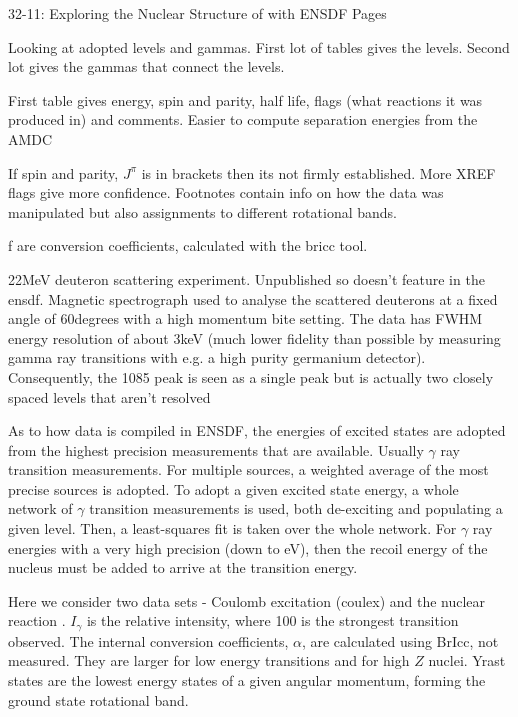 \begin{example}{3}{2-11: Exploring the Nuclear Structure of  with ENSDF Pages}

Looking at adopted levels and gammas. First lot of tables gives the levels. Second lot gives the gammas that connect the levels.

First table gives energy, spin and parity, half life, flags (what reactions it was produced in) and comments. 
Easier to compute separation energies from the AMDC

If spin and parity, \(J^\pi\) is in brackets then its not firmly established. More XREF flags give more confidence. Footnotes contain info on how the data was manipulated but also assignments to different rotational bands. 

f are conversion coefficients, calculated with the bricc tool.


22MeV deuteron scattering experiment. Unpublished so doesn't feature in the ensdf. Magnetic spectrograph used to analyse the scattered deuterons at a fixed angle of 60degrees with a high momentum bite setting. The data has FWHM energy resolution of about 3keV (much lower fidelity than possible by measuring gamma ray transitions with e.g. a high purity germanium detector). Consequently, the 1085 peak is seen as a single peak but is actually two closely spaced levels that aren't resolved 

As to how data is compiled in ENSDF, the energies of excited states are adopted from the highest precision measurements that are available. Usually \(\gamma\) ray transition measurements. For multiple sources, a weighted average of the most precise sources is adopted. To adopt a given excited state energy, a whole network of \(\gamma\) transition measurements is used, both de-exciting and populating a given level. Then, a least-squares fit is taken over the whole network. For \(\gamma\) ray energies with a very high precision (down to eV), then the recoil energy of the nucleus must be added to arrive at the transition energy. 
    

Here we consider two data sets - Coulomb excitation (coulex) and the nuclear reaction . \(I_\gamma\) is the relative intensity, where 100 is the strongest transition observed. The internal conversion coefficients, \(\alpha\), are calculated using BrIcc, not measured. They are larger for low energy transitions and for high \(Z\) nuclei. Yrast states are the lowest energy states of a given angular momentum, forming the ground state rotational band. 


\end{example}

